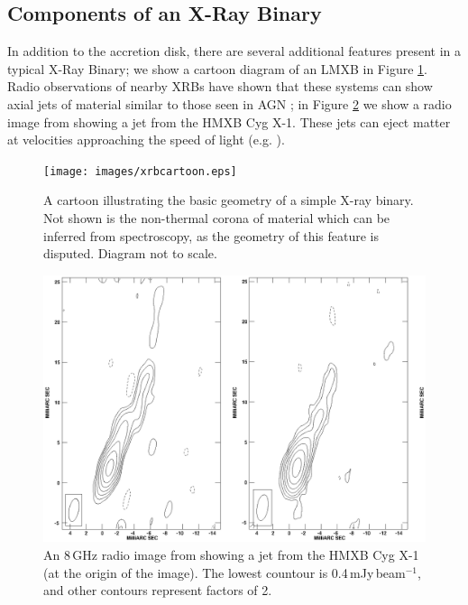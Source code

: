 \subsection{Components of an X-Ray Binary}

\par In addition to the accretion disk, there are several additional features present in a typical X-Ray Binary; we show a cartoon diagram of an LMXB in Figure \ref{fig:xrbcartoon}.   Radio observations of nearby XRBs have shown that these systems can show axial jets of material similar to those seen in AGN \citep{Geldzahler_Jet}; in Figure \ref{fig:jet} we show a radio image from \citet{Stirling_Jet} showing a jet from the HMXB Cyg X-1. These jets can eject matter at velocities approaching the speed of light (e.g. \citealp{Mirabel_Microquasar}).

\begin{figure}
    \texttt{[image: images/xrbcartoon.eps]}
    \captionsetup{singlelinecheck=off}
    \caption{A cartoon illustrating the basic geometry of a simple X-ray binary.  Not shown is the non-thermal corona of material which can be inferred from spectroscopy, as the geometry of this feature is disputed.  Diagram not to scale.}
   \label{fig:xrbcartoon}
\end{figure}

\begin{figure}
   \centering
    \includegraphics[width=0.5\columnwidth, trim = 17mm 0mm 17mm 0mm, clip]{images/jet.eps}
    \captionsetup{singlelinecheck=off}
    \caption{An 8\,GHz radio image from \citet{Stirling_Jet} showing a jet from the HMXB Cyg X-1 (at the origin of the image).  The lowest countour is 0.4\,mJy\,beam$^{-1}$, and other contours represent factors of 2.}
   \label{fig:jet}
\end{figure}

